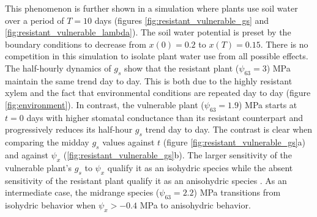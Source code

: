 \documentclass[utf8]{frontiersSCNS} %
\begin{document}
This phenomenon is further shown in a simulation where plants use soil water over a period of $T=10$ days (figures \ref{fig:resistant_vulnerable_gs} and \ref{fig:resistant_vulnerable_lambda}). The soil water potential is preset by the boundary conditions to decrease from $x(0)=0.2$ to $x(T)=0.15$. There is no competition in this simulation to isolate plant water use from all possible effects. The half-hourly dynamics of $g_s$ show that the resistant plant ($\psi_{63}=3$) MPa maintain the same trend day to day. This is both due to the highly resistant xylem and the fact that environmental conditions are repeated day to day (figure \ref{fig:environment}). In contrast, the vulnerable plant ($\psi_{63}=1.9$) MPa starts at $t=0$ days with higher stomatal conductance than its resistant counterpart and progressively reduces its half-hour $g_s$ trend day to day. The contrast is clear when comparing the midday $g_s$ values against $t$ (figure \ref{fig:resistant_vulnerable_gs}a) and against $\psi_x$ (\ref{fig:resistant_vulnerable_gs}b). The larger sensitivity of the vulnerable plant's $g_s$ to $\psi_x$ qualify it as an isohydric species while the absent sensitivity of the resistant plant qualify it as an anisohydric species \citep{Hochberg2017}. As an intermediate case, the midrange species ($\psi_{63}=2.2$) MPa transitions from isohydric behavior when $\psi_x>-0.4$ MPa to anisohydric behavior.
\end{document}

